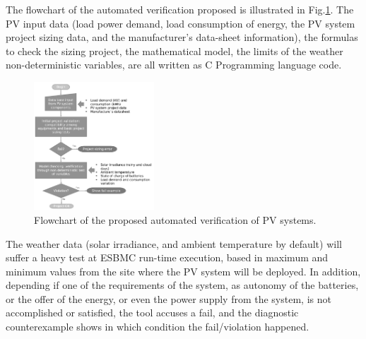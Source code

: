 \documentclass[journal]{IEEEtran}
\begin{document}
%
%
%
%
The flowchart of the automated verification proposed is illustrated in Fig.\ref{fig:flowchartgeneral}. 
The PV input data (load power demand, load consumption of energy, the PV system project sizing data, and the manufacturer's data-sheet information), the formulas to check the sizing project, the mathematical model, the limits of the weather non-deterministic variables, are all written as C Programming language code. 

\begin{figure}[h]
\includegraphics[width=0.4\textwidth]{flowchart_verification.png}
\centering
\caption{Flowchart of the proposed automated verification of PV systems.}
\label{fig:flowchartgeneral}
\end{figure}

The weather data (solar irradiance, and ambient temperature by default) will suffer a heavy test at ESBMC run-time execution, based in maximum and minimum values from the site where the PV system will be deployed. In addition, depending if one of the requirements of the system, as autonomy of the batteries, or the offer of the energy, or even the power supply from the system, is not accomplished or satisfied, the tool accuses a fail, and the diagnostic counterexample shows in which condition the fail/violation happened. 
\end{document}
